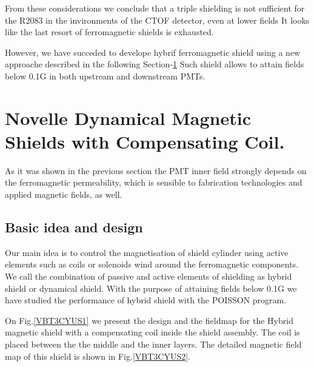 \documentclass[12pt]{article}
\begin{document}
From these considerations we conclude that  a  triple shielding  is  not  
sufficient for the R2083 in the invironments of the CTOF detector,
even at lower fields 
It looks like  the last resort of ferromagnetic shields  is exhausted.

However,  we have succeded to  develope hybrif ferromagnetic  shield using 
a new  approache described in the following Section-\ref{novelle}
Such shield allows  to attain fields below 0.1G in both  upstream and
downstream PMTs.




\newpage

\section{Novelle Dynamical Magnetic Shields with Compensating Coil.}

\label{novelle}
As it was shown in the previous section the PMT inner field 
strongly depends on the ferromagnetic permeability, which is  sensible to
 fabrication technologies and applied magnetic fields, as well.


\subsection{Basic idea and design}

Our main idea is to control the magnetisation of shield cylinder
using active elements such as coils or solenoids wind  around the 
ferromagnetic components.
We call the  combination  of passive  and active elements of shielding as hybrid
shield or dynamical shield.  With the purpose of attaining fields below 0.1G
we have studied the performance of  hybrid   shield with the POISSON program.


On Fig.\ref{VBT3CYUS1} we present the  design and the fieldmap  
for the Hybrid magnetic shield
with a compensating coil inside the shield assembly. 
The coil is placed between the  the middle and the inner layers.
The detailed magnetic field map of this shield  is shown in Fig.\ref{VBT3CYUS2}.
\end{document}

